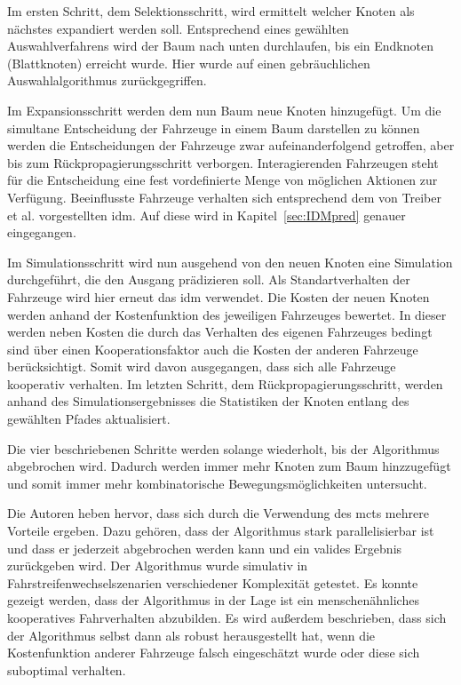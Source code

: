 Im ersten Schritt, dem Selektionsschritt, wird ermittelt welcher Knoten als n\"achstes expandiert werden soll. 
Entsprechend eines gew\"ahlten Auswahlverfahrens wird der Baum nach unten durchlaufen, bis ein Endknoten (Blattknoten) erreicht wurde. 
Hier wurde auf einen gebr\"auchlichen Auswahlalgorithmus zur\"uckgegriffen.

Im Expansionsschritt werden dem nun Baum neue Knoten hinzugef\"ugt. 
Um die simultane Entscheidung der Fahrzeuge in einem Baum darstellen zu k\"onnen werden die Entscheidungen der Fahrzeuge zwar aufeinanderfolgend getroffen, aber bis zum R\"uckpropagierungsschritt verborgen. 
Interagierenden Fahrzeugen steht f\"ur die Entscheidung eine fest vordefinierte Menge von m\"oglichen Aktionen zur Verf\"ugung.
Beeinflusste Fahrzeuge verhalten sich entsprechend dem von Treiber et al. \cite{Treiber2000} vorgestellten \gls{idm}. 
Auf diese wird in Kapitel~\ref{sec:IDMpred} genauer eingegangen. 

Im Simulationsschritt wird nun ausgehend von den neuen Knoten eine Simulation durchgef\"uhrt, die den Ausgang pr\"adizieren soll. 
Als Standartverhalten der Fahrzeuge wird hier erneut das \gls{idm} verwendet. 
Die Kosten der neuen Knoten werden anhand der Kostenfunktion des jeweiligen Fahrzeuges bewertet.
In dieser werden neben Kosten die durch das Verhalten des eigenen Fahrzeuges bedingt sind \"uber einen Kooperationsfaktor auch die Kosten der anderen Fahrzeuge ber\"ucksichtigt. 
Somit wird davon ausgegangen, dass sich alle Fahrzeuge kooperativ verhalten.
Im letzten Schritt, dem R\"uckpropagierungsschritt, werden anhand des Simulationsergebnisses die Statistiken der Knoten entlang des gew\"ahlten Pfades aktualisiert.

Die vier beschriebenen Schritte werden solange wiederholt, bis der Algorithmus abgebrochen wird.
Dadurch werden immer mehr Knoten zum Baum hinzzugef\"ugt und somit immer mehr kombinatorische Bewegungsm\"oglichkeiten untersucht.

Die Autoren heben hervor, dass sich durch die Verwendung des \gls{mcts} mehrere Vorteile ergeben.
Dazu geh\"oren, dass der Algorithmus stark parallelisierbar ist und dass er jederzeit abgebrochen werden kann und ein valides Ergebnis zur\"uckgeben wird.
Der Algorithmus wurde simulativ in Fahrstreifenwechselszenarien verschiedener Komplexit\"at getestet. 
Es konnte gezeigt werden, dass der Algorithmus in der Lage ist ein menschen\"ahnliches kooperatives Fahrverhalten abzubilden.
Es wird au{\ss}erdem beschrieben, dass sich der Algorithmus selbst dann als robust herausgestellt hat, wenn die Kostenfunktion anderer Fahrzeuge falsch eingesch\"atzt wurde oder diese sich suboptimal verhalten.


